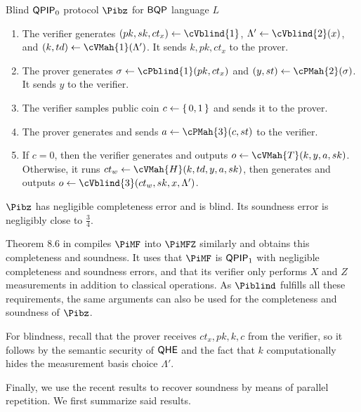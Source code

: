 \begin{protocol}{Blind $\operatorname{\mathsf{QPIP}}_0$ protocol $\Pibz$ for $\operatorname{\mathsf{BQP}}$ language $L$}
	\label{proto:QPIP0BQP}
	\begin{enumerate}
		\item The verifier generates $(pk, sk, ct_x)\leftarrow\cVblind{1}$,
			$\Lambda'\leftarrow\cVblind{2}(x)$,
			and $(k, td)\leftarrow\cVMah{1}(\Lambda')$.
			It sends $k, pk, ct_x$ to the prover.
		\item The prover generates $\sigma\leftarrow\cPblind{1}(pk, ct_x)$ and
			$(y, st)\leftarrow\cPMah{2}(\sigma)$.
			It sends $y$ to the verifier.
		\item The verifier samples public coin $c\leftarrow\set{0, 1}$ and sends it to the prover.
		\item The prover generates and sends $a\leftarrow\cPMah{3}(c, st)$ to the verifier.
		\item If $c=0$, then the verifier generates and outputs $o\leftarrow\cVMah{T}(k, y, a, sk)$.
			Otherwise, it runs $ct_w\leftarrow\cVMah{H}(k, td, y, a, sk)$,
			then generates and outputs $o\leftarrow\cVblind{3}(ct_w, sk, x, \Lambda')$.
	\end{enumerate}
\end{protocol}

\begin{thm}
	$\Pibz$ has negligible completeness error and is blind. Its soundness error is negligibly close to $\frac{3}{4}$.
\end{thm}
\begin{prf}
	Theorem $8.6$ in \cite{FOCS:Mahadev18a} compiles $\PiMF$ into $\PiMFZ$ similarly and obtains this completeness and soundness.
	It uses that $\PiMF$ is $\operatorname{\mathsf{QPIP}}_1$ with negligible completeness and soundness errors,
	and that its verifier only performs $X$ and $Z$ measurements in addition to classical operations.
	As $\Piblind$ fulfills all these requirements, the same arguments can also be used for the completeness and soundness of $\Pibz$.

	For blindness, recall that the prover receives $ct_x, pk, k, c$ from the verifier,
	so it follows by the semantic security of $\mathsf{QHE}$ and the fact that $k$ computationally hides the measurement basis choice $\Lambda'$.
\end{prf}

Finally, we use the recent results \cite{parallelrep, alagic2019twomessage} to recover soundness by means of parallel repetition.
We first summarize said results.

